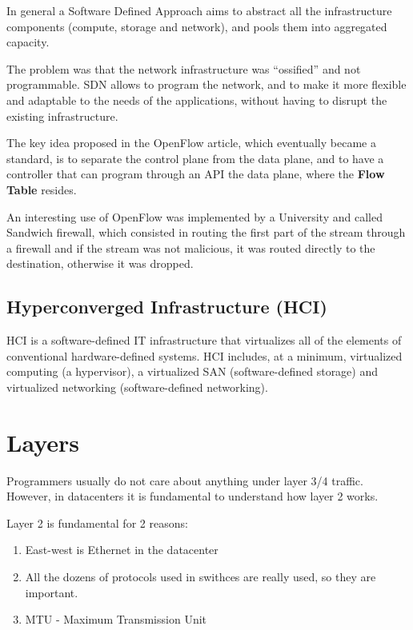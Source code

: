 In general a Software Defined Approach aims to abstract all the infrastructure components (compute, storage and network), and pools them into aggregated capacity.


The problem was that the network infrastructure was ``ossified'' and not programmable. SDN allows to program the network, and to make it more flexible and adaptable to the needs of the applications, without having to disrupt the existing infrastructure.

The key idea proposed in the OpenFlow article, which eventually became a standard, is to separate the control plane from the data plane, and to have a controller that can program through an API the data plane, where the \textbf{Flow Table} resides.

An interesting use of OpenFlow was implemented by a University and called Sandwich firewall, which consisted in routing the first part of the stream through a firewall and if the stream was not malicious, it was routed directly to the destination, otherwise it was dropped.


\subsection{Hyperconverged Infrastructure (HCI)}
HCI is a software-defined IT infrastructure that virtualizes all of the elements of conventional hardware-defined systems. HCI includes, at a minimum, virtualized computing (a hypervisor), a virtualized SAN (software-defined storage) and virtualized networking (software-defined networking).

\section{Layers}
Programmers usually do not care about anything under layer 3/4 traffic.
However, in datacenters it is fundamental to understand how layer 2 works.

Layer 2 is fundamental for 2 reasons:
\begin{enumerate}
   \item East-west is Ethernet in the datacenter
   \item All the dozens of protocols used in swithces are really used, so they are important.
   \item MTU - Maximum Transmission Unit
\end{enumerate}


